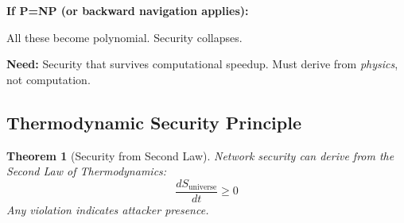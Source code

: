 \documentclass[twocolumn,10pt]{article}
\newtheorem{theorem}{Theorem}[section]
\theoremstyle{definition}
\theoremstyle{remark}
\begin{document}
\vspace{0.2cm}
\noindent\textbf{If P=NP (or backward navigation applies):}

All these become polynomial. Security collapses.

\vspace{0.2cm}
\noindent\textbf{Need:} Security that survives computational speedup. Must derive from \textit{physics}, not computation.

\subsection{Thermodynamic Security Principle}

\begin{theorem}[Security from Second Law]
\label{thm:thermodynamic_security}
Network security can derive from the Second Law of Thermodynamics:
\begin{equation}
\frac{dS_{\text{universe}}}{dt} \geq 0
\end{equation}
Any violation indicates attacker presence.
\end{theorem}
\end{document}
